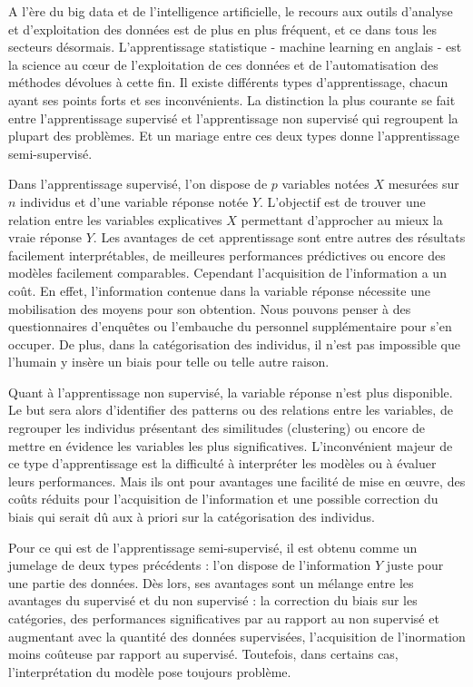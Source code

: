 \documentclass[12pt,a4paper]{book}
\newcommand{\1}{\mathds{1}}
\begin{document}
A l'ère du big data et de l'intelligence artificielle, le recours aux outils d'analyse et d'exploitation des données est de plus en plus fréquent, et ce dans tous les secteurs désormais. L'apprentissage statistique - machine learning en anglais - est la science au cœur de l'exploitation de ces données et de l'automatisation des méthodes dévolues à cette fin. Il existe différents types d'apprentissage, chacun ayant ses points forts et ses inconvénients. La distinction la plus courante se fait entre l'apprentissage supervisé et l'apprentissage non supervisé qui regroupent la plupart des problèmes. Et un mariage entre ces deux types donne l'apprentissage semi-supervisé. 

Dans l'apprentissage supervisé, l'on dispose de $p$ variables notées $X$ mesurées sur $n$ individus et d'une variable réponse notée $Y$. L'objectif est de trouver une relation entre les variables explicatives $X$ permettant d'approcher au mieux la vraie réponse $Y$. Les avantages de cet apprentissage sont entre autres des résultats facilement interprétables, de meilleures performances prédictives ou encore des modèles facilement comparables. Cependant l'acquisition de l'information a un coût. En effet, l'information contenue dans la variable réponse nécessite une mobilisation des moyens pour son obtention. Nous pouvons penser à des questionnaires d'enquêtes ou l'embauche du personnel supplémentaire pour s'en occuper. De plus, dans la catégorisation des individus, il n'est pas impossible que l'humain y insère un biais pour telle ou telle autre raison.

Quant à l'apprentissage non supervisé, la variable réponse n'est plus disponible. Le but sera alors d'identifier des patterns ou des relations entre les variables, de regrouper les individus présentant des similitudes (clustering) ou encore de mettre en évidence les variables les plus significatives. L'inconvénient majeur de ce type d'apprentissage est la difficulté à interpréter les modèles ou à évaluer leurs performances.  Mais ils ont pour avantages une facilité de mise en œuvre, des coûts réduits pour l'acquisition de l'information et une possible correction du biais qui serait dû aux à priori sur la catégorisation des individus.

Pour ce qui est de l'apprentissage semi-supervisé, il est obtenu comme un jumelage de deux types précédents : l'on dispose de l'information $Y$ juste pour une partie des données. Dès lors, ses avantages sont un mélange entre les avantages du supervisé et du non supervisé : la correction du biais sur les catégories, des performances significatives par au rapport au non supervisé et augmentant avec la quantité des données supervisées, l'acquisition de l'inormation moins coûteuse par rapport au supervisé. Toutefois, dans certains cas, l'interprétation du modèle pose toujours problème.
\end{document}
